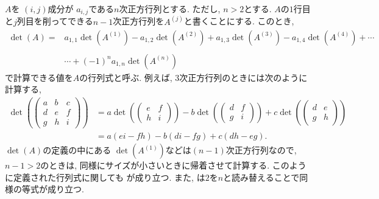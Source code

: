 \begin{remark}
  \label{def:det:generic}
  $A$を
  $(i,j)$成分が
  $a_{i,j}$である$n$次正方行列とする.
  ただし, $n>2$とする.
  $A$の$1$行目と$j$列目を削ってできる$n-1$次正方行列を$A^{(j)}$と書くことにする.
  このとき, 
  \begin{align*}
    \det(A)=&a_{1,1}\det(A^{(1)})-a_{1,2}\det(A^{(2)})+a_{1,3}\det(A^{(3)})-a_{1,4}\det(A^{(4)})+\cdots\\
    \\&\cdots +(-1)^n a_{1,n}\det(A^{(n)})
  \end{align*}
  で計算できる値を$A$の行列式と呼ぶ.
  例えば,
  $3$次正方行列のときには次のように計算する, 
  \begin{align*}
    \det(
    \begin{pmatrix}
      a&b&c\\
      d&e&f\\
      g&h&i      
    \end{pmatrix}
    )
    &=a
    \det(
    \begin{pmatrix}
      e&f\\
      h&i      
    \end{pmatrix}
    )-b
    \det(
    \begin{pmatrix}
      d&f\\
      g&i      
    \end{pmatrix}
    )
    +c
    \det(
    \begin{pmatrix}
      d&e\\
      g&h      
    \end{pmatrix}
    )\\
    &=a(ei-fh)
    -b(di-fg)
    +c(dh-eg).
  \end{align*}
  $\det(A)$の定義の中にある
  $\det(A^{(1)})$などは$(n-1)$次正方行列なので, $n-1>2$のときは,
  同様にサイズが小さいときに帰着させて計算する.
  このように定義された行列式に関しても
  が成り立つ.
  また, は$2$を$n$と読み替えることで同様の等式が成り立つ.
\end{remark}

